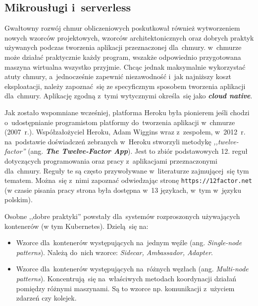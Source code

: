 \documentclass[12pt,a4paper,twoside,titlepage,openright]{book}
\begin{document}
\subsection{Mikrousługi i~serverless} \label{section:mikroserwisy}

Gwałtowny rozwój chmur obliczeniowych poskutkował również wytworzeniem nowych wzorców projektowych, wzorców architektonicznych oraz dobrych praktyk używanych podczas tworzenia aplikacji przeznaczonej dla~chmury. w~chmurze może działać praktycznie każdy program, wszakże odpowiednio przygotowana maszyna wirtualna wszystko przyjmie. Chcąc jednak maksymalnie wykorzystać atuty chmury, a~jednocześnie zapewnić niezawodność i~jak najniższy koszt eksploatacji, należy zapoznać~się ze specyficznym sposobem tworzenia aplikacji dla~chmury. Aplikację zgodną z~tymi wytycznymi określa~się jako \textbf{\textit{cloud native}}.

Jak zostało wspomniane wcześniej, platforma Heroku była pionierem jeśli chodzi o~udostępnianie programistom platformy do~tworzenia aplikacji w~chmurze (2007~r.). Współzałożyciel Heroku, Adam Wiggins wraz z~zespołem, w~2012~r. na~podstawie doświadczeń zebranych w~Heroku stworzyli metodykę \textit{,,twelve-factor''} (ang. \textbf{\textit{The Twelve-Factor App}}). Jest to zbiór podstawowych 12. reguł dotyczących programowania oraz pracy z~aplikacjami przeznaczonymi dla~chmury. Reguły te są często przywoływane w~literaturze zajmującej~się tym tematem.\cite{cloudFoundry, microservicesPacktNetCore} Można~się z~nimi zapoznać odwiedzając stronę \texttt{https://12factor.net} (w czasie pisania pracy strona była dostępna w~13 językach, w~tym w~języku polskim).

Osobne ,,dobre praktyki'' powstały dla~systemów rozproszonych używających kontenerów (w tym Kubernetes). Dzielą~się na:
\begin{itemize}
\item Wzorce dla~kontenerów występujących na~jednym węźle (ang. \textit{Single-node patterns}). Należą do~nich wzorce: \textit{Sidecar, Ambassador, Adapter}.
\item Wzorce dla~kontenerów występujących na~różnych węzłach (ang. \textit{Multi-node patterns}). Koncentrują~się na~właściwych metodach koordynacji działań pomiędzy różnymi maszynami. Są to wzorce np. komunikacji z~użyciem zdarzeń czy kolejek.  \cite{kubernetesPacktMastering, distributedSystems}
\end{itemize}
\end{document}
